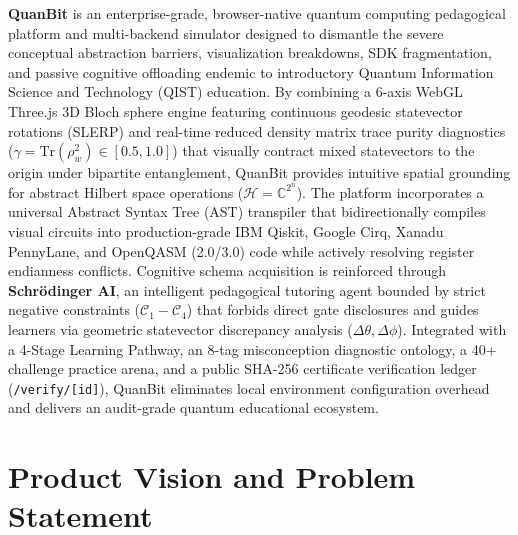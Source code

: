 \documentclass[11pt, a4paper]{article}
\begin{document}
\noindent\textbf{QuanBit} is an enterprise-grade, browser-native quantum computing pedagogical platform and multi-backend simulator designed to dismantle the severe conceptual abstraction barriers, visualization breakdowns, SDK fragmentation, and passive cognitive offloading endemic to introductory Quantum Information Science and Technology (QIST) education. By combining a 6-axis WebGL Three.js 3D Bloch sphere engine featuring continuous geodesic statevector rotations (SLERP) and real-time reduced density matrix trace purity diagnostics ($\gamma = \text{Tr}(\rho_w^2) \in [0.5, 1.0]$) that visually contract mixed statevectors to the origin under bipartite entanglement, QuanBit provides intuitive spatial grounding for abstract Hilbert space operations ($\mathcal{H} = \mathbb{C}^{2^n}$). The platform incorporates a universal Abstract Syntax Tree (AST) transpiler that bidirectionally compiles visual circuits into production-grade IBM Qiskit, Google Cirq, Xanadu PennyLane, and OpenQASM (2.0/3.0) code while actively resolving register endianness conflicts. Cognitive schema acquisition is reinforced through \textbf{Schr{\"o}dinger AI}, an intelligent pedagogical tutoring agent bounded by strict negative constraints ($\mathcal{C}_1-\mathcal{C}_4$) that forbids direct gate disclosures and guides learners via geometric statevector discrepancy analysis ($\Delta\theta, \Delta\phi$). Integrated with a 4-Stage Learning Pathway, an 8-tag misconception diagnostic ontology, a 40+ challenge practice arena, and a public SHA-256 certificate verification ledger (\texttt{/verify/[id]}), QuanBit eliminates local environment configuration overhead and delivers an audit-grade quantum educational ecosystem.

\vspace{0.6cm}
\tableofcontents
\newpage

\section{Product Vision and Problem Statement}
\end{document}
